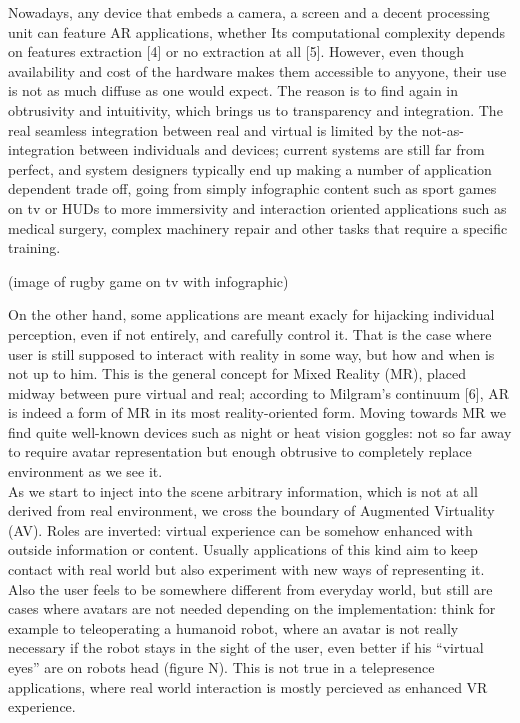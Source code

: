 Nowadays, any device that embeds a camera, a screen and a decent processing unit can feature AR applications, whether Its computational complexity depends on features extraction [4] or no extraction at all [5]. However, even though availability and cost of the hardware makes them accessible to anyyone, their use is not as much diffuse as one would expect. The reason is to find again in obtrusivity and intuitivity, which brings us to transparency and integration. The real seamless integration between real and virtual is limited by the not-as-integration between individuals and devices; current systems are still far from perfect, and system designers typically end up making a number of application dependent trade off, going from simply infographic content such as sport games on tv or HUDs to more immersivity and interaction oriented applications such as medical surgery, complex machinery repair and other tasks that require a specific training.

(image of rugby game on tv with infographic)

On the other hand, some applications are meant exacly for hijacking individual perception, even if not entirely, and carefully control it. That is the case where user is still supposed to interact with reality in some way, but how and when is not up to him. This is the general concept for Mixed Reality (MR), placed midway between pure virtual and real; according to Milgram’s continuum [6], AR is indeed a form of MR in its most reality-oriented form. Moving towards MR we find quite well-known devices such as night or heat vision goggles: not so far away to require avatar representation but enough obtrusive to completely replace environment as we see it.\\
As we start to inject into the scene arbitrary information, which is not at all derived from real environment, we cross the boundary of Augmented Virtuality (AV). Roles are inverted: virtual experience can be somehow enhanced with outside information or content. Usually applications of this kind aim to keep contact with real world but also experiment with new ways of representing it. Also the user feels to be somewhere different from everyday world, but still are cases where avatars are not needed depending on the implementation: think for example to teleoperating a humanoid robot, where an avatar is not really necessary if the robot stays in the sight of the user, even better if his “virtual eyes” are on robots head (figure N). This is not true in a telepresence applications, where real world interaction is mostly percieved as enhanced VR experience.

